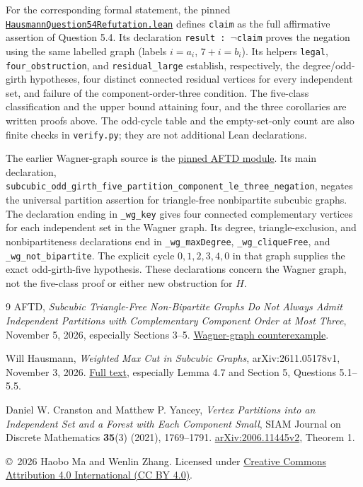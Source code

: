 \documentclass[11pt]{article}
\begin{document}
For the corresponding formal statement, the pinned
\href{https://github.com/the-omega-institute/trureturing/blob/6974dba01daa1a25cc74b87a86c191e95fe2c681/D5/S3/Combinatorics/Graph/ComponentPacking/HausmannQuestion54Refutation.lean}{\texttt{HausmannQuestion54Refutation.lean}}
defines \texttt{claim} as the full affirmative assertion of Question 5.4.
Its declaration \texttt{result :}\ $\neg$\texttt{claim} proves the negation using the
same labelled graph (labels $i=a_i$, $7+i=b_i$). Its helpers
\texttt{legal}, \texttt{four\_obstruction}, and \texttt{residual\_large}
establish, respectively, the degree/odd-girth hypotheses, four distinct
connected residual vertices for every independent set, and failure of
the component-order-three condition. The five-class classification and
the upper bound attaining four, and the three corollaries are written proofs
above. The odd-cycle table and the empty-set-only count are also finite
checks in \texttt{verify.py}; they are not additional Lean declarations.

The earlier Wagner-graph source is the
\href{https://github.com/rainwangphy/aftd-platform/blob/433d28c73eba86e5864ff92226afde4bb1c6e270/lean/AFTD/Kb/Tcs/SubcubicOddGirthFivePartitionComponentLeThreeNegation.lean}{pinned AFTD module}.
Its main declaration,
\nolinkurl{subcubic_odd_girth_five_partition_component_le_three_negation},
negates the universal partition assertion for triangle-free nonbipartite
subcubic graphs. The declaration ending in \texttt{\_wg\_key} gives
four connected complementary vertices for each independent set in the
Wagner graph. Its degree, triangle-exclusion, and nonbipartiteness
declarations end in \texttt{\_wg\_maxDegree}, \texttt{\_wg\_cliqueFree},
and \texttt{\_wg\_not\_bipartite}.
The explicit cycle $0,1,2,3,4,0$ in that graph supplies the exact
odd-girth-five hypothesis. These declarations concern the Wagner graph,
not the five-class proof or either new obstruction for $H$.

\begin{thebibliography}{9}
AFTD, \emph{Subcubic Triangle-Free Non-Bipartite Graphs Do Not Always
Admit Independent Partitions with Complementary Component Order at Most Three},
November 5, 2026, especially Sections 3--5.
\href{https://rainwangphy.github.io/aftd-platform/blog/2026-11-05-op-1087/}{Wagner-graph counterexample}.

Will Hausmann, \emph{Weighted Max Cut in Subcubic Graphs},
arXiv:2611.05178v1, November 3, 2026.
\href{https://arxiv.org/html/2611.05178v1}{Full text},
especially Lemma 4.7 and Section 5, Questions 5.1--5.5.

Daniel W. Cranston and Matthew P. Yancey,
\emph{Vertex Partitions into an Independent Set and a Forest with Each
Component Small}, SIAM Journal on Discrete Mathematics
\textbf{35}(3) (2021), 1769--1791.
\href{https://arxiv.org/html/2006.11445v2}{arXiv:2006.11445v2}, Theorem 1.
\end{thebibliography}

\smallskip
\noindent\small
\copyright\ 2026 Haobo Ma and Wenlin Zhang.
Licensed under \href{https://creativecommons.org/licenses/by/4.0/}
{Creative Commons Attribution 4.0 International (CC BY 4.0)}.
\end{document}

